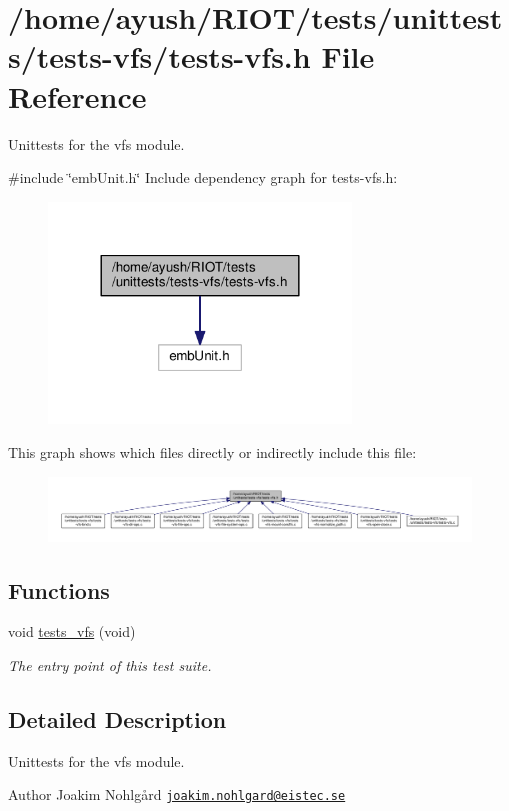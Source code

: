 \hypertarget{tests-vfs_8h}{}\section{/home/ayush/\+R\+I\+O\+T/tests/unittests/tests-\/vfs/tests-\/vfs.h File Reference}
\label{tests-vfs_8h}


Unittests for the {\ttfamily vfs} module.  


{\ttfamily \#include \char`\"{}emb\+Unit.\+h\char`\"{}}\newline
Include dependency graph for tests-\/vfs.h\+:
\nopagebreak
\begin{figure}[H]
\begin{center}
\leavevmode
\includegraphics[width=228pt]{tests-vfs_8h__incl}
\end{center}
\end{figure}
This graph shows which files directly or indirectly include this file\+:
\nopagebreak
\begin{figure}[H]
\begin{center}
\leavevmode
\includegraphics[width=350pt]{tests-vfs_8h__dep__incl}
\end{center}
\end{figure}
\subsection*{Functions}
\begin{DoxyCompactItemize}
\item 
void \hyperlink{group__unittests_gad7fb89debf7b41f1a3a0d7d988f7654c}{tests\+\_\+vfs} (void)
\begin{DoxyCompactList}\small\item\em The entry point of this test suite. \end{DoxyCompactList}\end{DoxyCompactItemize}


\subsection{Detailed Description}
Unittests for the {\ttfamily vfs} module. 

\begin{DoxyAuthor}{Author}
Joakim Nohlgård \href{mailto:joakim.nohlgard@eistec.se}{\tt joakim.\+nohlgard@eistec.\+se} 
\end{DoxyAuthor}
